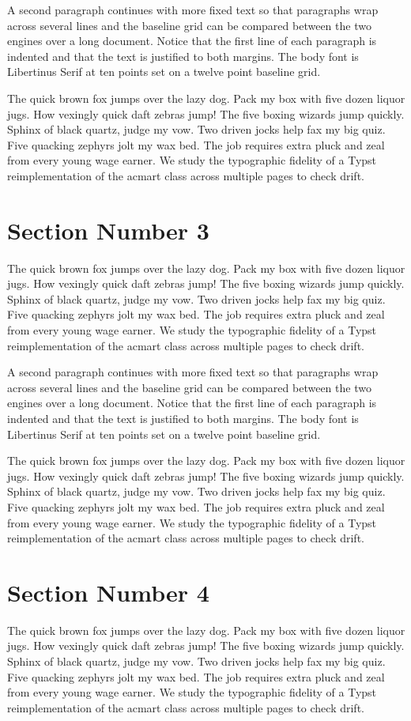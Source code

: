 \documentclass[acmsmall,nonacm]{acmart}
\begin{document}
A second paragraph continues with more fixed text so that paragraphs wrap across several lines and the baseline grid can be compared between the two engines over a long document. Notice that the first line of each paragraph is indented and that the text is justified to both margins. The body font is Libertinus Serif at ten points set on a twelve point baseline grid.

The quick brown fox jumps over the lazy dog. Pack my box with five dozen liquor jugs. How vexingly quick daft zebras jump! The five boxing wizards jump quickly. Sphinx of black quartz, judge my vow. Two driven jocks help fax my big quiz. Five quacking zephyrs jolt my wax bed. The job requires extra pluck and zeal from every young wage earner. We study the typographic fidelity of a Typst reimplementation of the acmart class across multiple pages to check drift.

\section{Section Number 3}
The quick brown fox jumps over the lazy dog. Pack my box with five dozen liquor jugs. How vexingly quick daft zebras jump! The five boxing wizards jump quickly. Sphinx of black quartz, judge my vow. Two driven jocks help fax my big quiz. Five quacking zephyrs jolt my wax bed. The job requires extra pluck and zeal from every young wage earner. We study the typographic fidelity of a Typst reimplementation of the acmart class across multiple pages to check drift.

A second paragraph continues with more fixed text so that paragraphs wrap across several lines and the baseline grid can be compared between the two engines over a long document. Notice that the first line of each paragraph is indented and that the text is justified to both margins. The body font is Libertinus Serif at ten points set on a twelve point baseline grid.

The quick brown fox jumps over the lazy dog. Pack my box with five dozen liquor jugs. How vexingly quick daft zebras jump! The five boxing wizards jump quickly. Sphinx of black quartz, judge my vow. Two driven jocks help fax my big quiz. Five quacking zephyrs jolt my wax bed. The job requires extra pluck and zeal from every young wage earner. We study the typographic fidelity of a Typst reimplementation of the acmart class across multiple pages to check drift.

\section{Section Number 4}
The quick brown fox jumps over the lazy dog. Pack my box with five dozen liquor jugs. How vexingly quick daft zebras jump! The five boxing wizards jump quickly. Sphinx of black quartz, judge my vow. Two driven jocks help fax my big quiz. Five quacking zephyrs jolt my wax bed. The job requires extra pluck and zeal from every young wage earner. We study the typographic fidelity of a Typst reimplementation of the acmart class across multiple pages to check drift.
\end{document}

